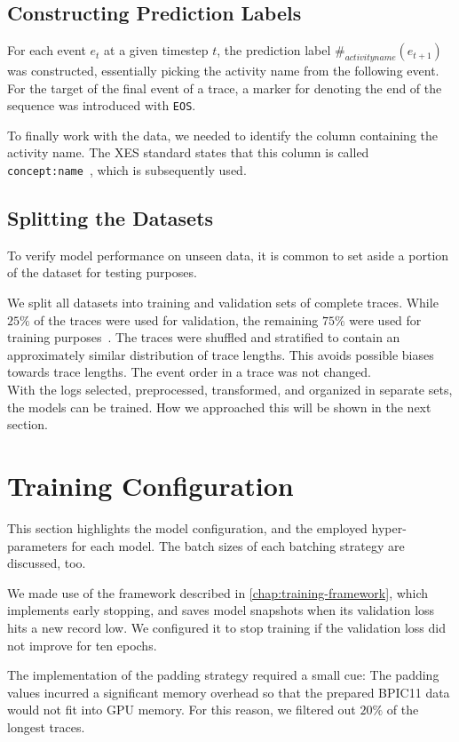 \subsection*{Constructing Prediction Labels}
For each event $e_t$ at a given timestep $t$, the prediction label $\#_{activity name}(e_{t+1})$ was constructed, essentially picking the activity name from the following event. For the target of the final event of a trace, a marker for denoting the end of the sequence was introduced with \verb=EOS=.

To finally work with the data, we needed to identify the column containing the activity name.
The XES standard states that this column is called \verb=concept:name=~\cite{Aalst2016}, which is subsequently used.

\subsection*{Splitting the Datasets}
To verify model performance on unseen data, it is common to set aside a portion of the dataset for testing purposes.

We split all datasets into training and validation sets of complete traces. While $25\%$ of the traces were used for validation, the remaining $75\%$ were used for training purposes~\cite{kuhn2013applied}. The traces were shuffled and stratified to contain an approximately similar distribution of trace lengths. This avoids possible biases towards trace lengths. The event order in a trace was not changed.\\

With the logs selected, preprocessed, transformed, and organized in separate sets, the models can be trained. How we approached this will be shown in the next section.

\section{Training Configuration}\label{sec:method:test-setup}
This section highlights the model configuration, and the employed hyper-parameters for each model.
The batch sizes of each batching strategy are discussed, too.

We made use of the framework described in \autoref{chap:training-framework}, which implements early stopping, and saves model snapshots when its validation loss hits a new record low. We configured it to stop training if the validation loss did not improve for ten epochs.

The implementation of the padding strategy required a small cue: The padding values incurred a significant memory overhead so that the prepared BPIC11 data would not fit into GPU memory.
For this reason, we filtered out $20\%$ of the longest traces.

